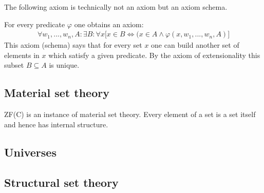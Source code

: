 	The following axiom is technically not an axiom but an axiom schema.
	\begin{axiom}[Specification]
		For every predicate $\varphi$ one obtains an axiom:
		\begin{gather}
			\forall w_1, ..., w_n, A:\exists B:\forall x\big[x\in B\iff(x\in A\land \varphi(x, w_1, ..., w_n, A)\big]
		\end{gather}
		This axiom (schema) says that for every set $x$ one can build another set of elements in $x$ which satisfy a given predicate. By the axiom of extensionality this subset $B\subseteq A$ is unique.
	\end{axiom}

\subsection{Material set theory}

	ZF(C) is an instance of material set theory. Every element of a set is a set itself and hence has internal structure.


\subsection{Universes}


\subsection{Structural set theory}

